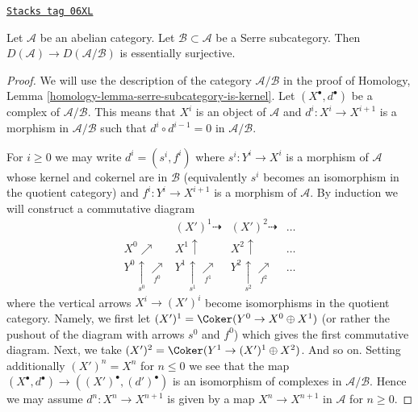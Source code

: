 \begin{lemma}
\label{derived-lemma-derived-of-quotient}
\href{https://stacks.math.columbia.edu/tag/06XL}{\texttt{Stacks tag 06XL}}

Let $\mathcal{A}$ be an abelian category.
Let $\mathcal{B} \subset \mathcal{A}$ be a Serre subcategory.
Then $D(\mathcal{A}) \to D(\mathcal{A}/\mathcal{B})$
is essentially surjective.
\end{lemma}

\begin{proof}
We will use the description of the category $\mathcal{A}/\mathcal{B}$
in the proof of
Homology, Lemma \ref{homology-lemma-serre-subcategory-is-kernel}.
Let $(X^\bullet, d^\bullet)$ be a complex of $\mathcal{A}/\mathcal{B}$.
This means that $X^i$ is an object of $\mathcal{A}$ and
$d^i : X^i \to X^{i + 1}$ is a morphism in $\mathcal{A}/\mathcal{B}$
such that $d^i \circ d^{i - 1} = 0$ in $\mathcal{A}/\mathcal{B}$.

\medskip\noindent
For $i \geq 0$ we may write $d^i = (s^i, f^i)$ where $s^i : Y^i \to X^i$
is a morphism of $\mathcal{A}$ whose kernel and cokernel are in $\mathcal{B}$
(equivalently $s^i$ becomes an isomorphism in the quotient category)
and $f^i : Y^i \to X^{i + 1}$ is a morphism of $\mathcal{A}$.
By induction we will construct a commutative diagram
$$
\begin{array}{cccc} & (X')^1 \dashrightarrow & (X')^2 \dashrightarrow & \ldots \\ X^0 \nearrow & X^1 \uparrow & X^2 \uparrow & \ldots \\ Y^0 \underset{s^0}{\uparrow}\underset{f^0}{\nearrow} & Y^1 \underset{s^1}{\uparrow}\underset{f^1}{\nearrow} & Y^2 \underset{s^2}{\uparrow}\underset{f^2}{\nearrow} & \ldots\end{array}
$$
where the vertical arrows $X^i \to (X')^i$ become isomorphisms
in the quotient category. Namely, we first let
$(X')^1 = \Coker(Y^0 \to X^0 \oplus X^1)$ (or rather the
pushout of the diagram with arrows $s^0$ and $f^0$) which gives the
first commutative diagram. Next, we take
$(X')^2 = \Coker(Y^1 \to (X')^1 \oplus X^2)$. And so on.
Setting additionally $(X')^n = X^n$ for $n \leq 0$ we see that the map
$(X^\bullet, d^\bullet) \to ((X')^\bullet, (d')^\bullet)$
is an isomorphism of complexes in $\mathcal{A}/\mathcal{B}$.
Hence we may assume $d^n : X^n \to X^{n + 1}$ is given
by a map $X^n \to X^{n + 1}$ in $\mathcal{A}$ for $n \geq 0$.


\end{proof}
